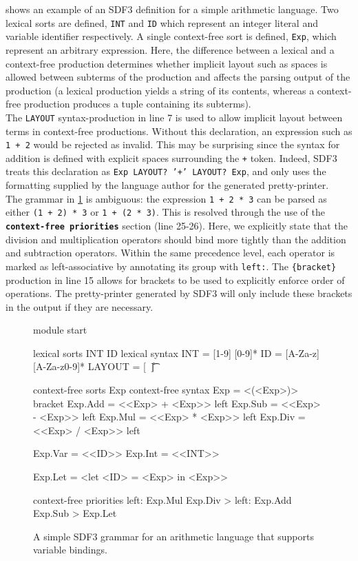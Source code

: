  shows an example of an SDF3 definition for a simple arithmetic language. Two lexical sorts are defined, \texttt{INT} and \texttt{ID} which represent an integer literal and variable identifier respectively. A single context-free sort is defined, \texttt{Exp}, which represent an arbitrary expression. Here, the difference between a lexical and a context-free production determines whether implicit layout such as spaces is allowed between subterms of the production and affects the parsing output of the production (a lexical production yields a string of its contents, whereas a context-free production produces a tuple containing its subterms).\\

The \texttt{LAYOUT} syntax-production in line 7 is used to allow implicit layout between terms in context-free productions. Without this declaration, an expression such as \texttt{1 + 2} would be rejected as invalid. This may be surprising since the syntax for addition is defined with explicit spaces surrounding the \texttt{+} token. Indeed, SDF3 treats this declaration as \texttt{Exp LAYOUT? '+' LAYOUT? Exp}, and only uses the formatting supplied by the language author for the generated pretty-printer.\\

The grammar in \cref{fig:sdf3_example} is ambiguous: the expression \texttt{1 + 2 * 3} can be parsed as either \texttt{(1 + 2) * 3} or \texttt{1 + (2 * 3)}. This is resolved through the use of the \textbf{\texttt{context-free priorities}} section (line 25-26). Here, we explicitly state that the division and multiplication operators should bind more tightly than the addition and subtraction operators. Within the same precedence level, each operator is marked as left-associative by annotating its group with \texttt{left:}. The \texttt{\{bracket\}} production in line 15 allows for brackets to be used to explicitly enforce order of operations. The pretty-printer generated by SDF3 will only include these brackets in the output if they are necessary.\\

\begin{figure}
  \begin{sdf3}
module start

lexical sorts INT ID
lexical syntax
  INT = [1-9] [0-9]*
  ID = [A-Za-z] [A-Za-z0-9]*
  LAYOUT = [\ \n\r\t]

context-free sorts Exp
context-free syntax
  Exp = <(<Exp>)> {bracket}
  Exp.Add = <<Exp> + <Exp>> {left}
  Exp.Sub = <<Exp> - <Exp>> {left}
  Exp.Mul = <<Exp> * <Exp>> {left}
  Exp.Div = <<Exp> / <Exp>> {left}

  Exp.Var = <<ID>>
  Exp.Int = <<INT>>

  Exp.Let = <let <ID> = <Exp> in <Exp>>

context-free priorities
  {left: Exp.Mul Exp.Div} > {left: Exp.Add Exp.Sub} > {Exp.Let}
  \end{sdf3}
  \caption{A simple SDF3 grammar for an arithmetic language that supports variable bindings.}
  \label{fig:sdf3_example}
\end{figure}

